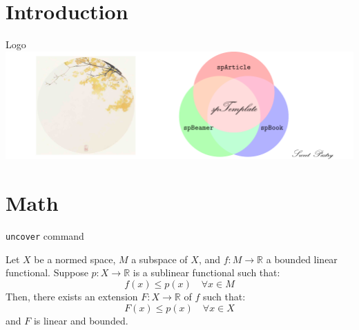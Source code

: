\documentclass[
    ref = refDemo,
    style = 0
]{spBeamer}
\begin{document}
    \section{Introduction}
        \begin{frame}{Logo}
                \includegraphics[width=\textwidth]{cover.pdf}
        \end{frame}

    \section{Math}
        \begin{frame}{\texttt{uncover} command}
        \end{frame}

        \begin{frame}
            \begin{theorem}
                Let \( X \) be a normed space, \( M \) a subspace of \( X \), and \( f: M \to \mathbb{R} \) a bounded linear functional. Suppose \( p: X \to \mathbb{R} \) is a sublinear functional such that:
                \[
                f(x) \leq p(x) \quad \forall x \in M
                \]
                Then, there exists an extension \( F: X \to \mathbb{R} \) of \( f \) such that:
                \[
                F(x) \leq p(x) \quad \forall x \in X
                \]
                and \( F \) is linear and bounded.
            \end{theorem}
        \end{frame}
        
\end{document}
